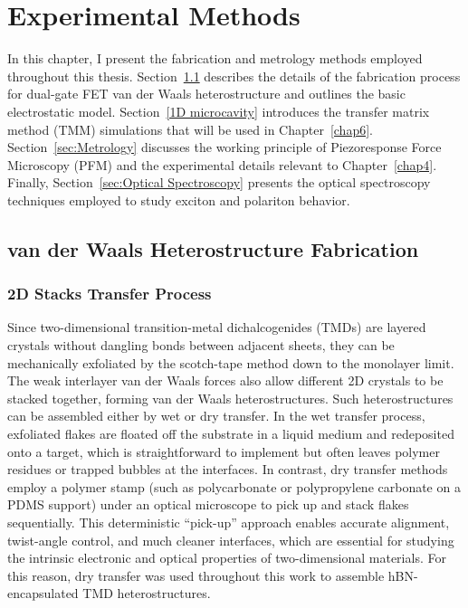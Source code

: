 
\renewcommand{\thechapter}{3}

\chapter{Experimental Methods}
\label{chap3}

In this chapter, I present the fabrication and metrology methods employed throughout this thesis. 
Section~\ref{sec:van der Waals heterostructure Fabrication} describes the details of the fabrication process for dual-gate FET van der Waals heterostructure and outlines the basic electrostatic model.
Section~\ref{1D microcavity} introduces the transfer matrix method (TMM) simulations that will be used in Chapter~\ref{chap6}.
Section~\ref{sec:Metrology} discusses the working principle of Piezoresponse Force Microscopy (PFM) and the experimental details relevant to Chapter~\ref{chap4}. 
Finally, Section~\ref{sec:Optical Spectroscopy} presents the optical spectroscopy techniques employed to study exciton and polariton behavior.

\section{van der Waals Heterostructure Fabrication} \label{sec:van der Waals heterostructure Fabrication}

\subsection{2D Stacks Transfer Process}
\label{sec:PC Dry transfe}
Since two-dimensional transition-metal dichalcogenides (TMDs) are layered crystals without dangling bonds between adjacent sheets, they can be mechanically exfoliated by the scotch-tape method down to the monolayer limit. 
The weak interlayer van der Waals forces also allow different 2D crystals to be stacked together, forming van der Waals heterostructures. 
Such heterostructures can be assembled either by wet or dry transfer. In the wet transfer process, exfoliated flakes are floated off the substrate in a liquid medium and redeposited onto a target, which is straightforward to implement but often leaves polymer residues or trapped bubbles at the interfaces. 
In contrast, dry transfer methods employ a polymer stamp (such as polycarbonate or polypropylene carbonate on a PDMS support) under an optical microscope to pick up and stack flakes sequentially. 
This deterministic “pick-up” approach enables accurate alignment, twist-angle control, and much cleaner interfaces, which are essential for studying the intrinsic electronic and optical properties of two-dimensional materials. 
For this reason, dry transfer was used throughout this work to assemble hBN-encapsulated TMD heterostructures.

